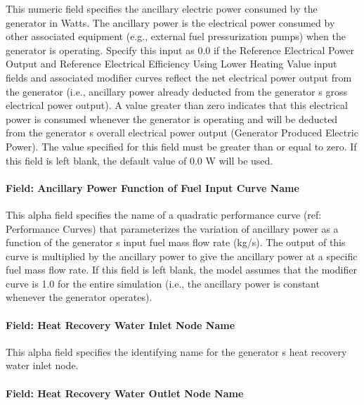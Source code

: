 This numeric field specifies the ancillary electric power consumed by the generator in Watts. The ancillary power is the electrical power consumed by other associated equipment (e.g., external fuel pressurization pumps) when the generator is operating. Specify this input as 0.0 if the Reference Electrical Power Output and Reference Electrical Efficiency Using Lower Heating Value input fields and associated modifier curves reflect the net electrical power output from the generator (i.e., ancillary power already deducted from the generator s gross electrical power output). A value greater than zero indicates that this electrical power is consumed whenever the generator is operating and will be deducted from the generator s overall electrical power output (Generator Produced Electric Power). The value specified for this field must be greater than or equal to zero. If this field is left blank, the default value of 0.0 W will be used.

\paragraph{Field: Ancillary Power Function of Fuel Input Curve Name}\label{field-ancillary-power-function-of-fuel-input-curve-name}

This alpha field specifies the name of a quadratic performance curve (ref: Performance Curves) that parameterizes the variation of ancillary power as a function of the generator s input fuel mass flow rate (kg/s). The output of this curve is multiplied by the ancillary power to give the ancillary power at a specific fuel mass flow rate. If this field is left blank, the model assumes that the modifier curve is 1.0 for the entire simulation (i.e., the ancillary power is constant whenever the generator operates).

\paragraph{Field: Heat Recovery Water Inlet Node Name}\label{field-heat-recovery-water-inlet-node-name}

This alpha field specifies the identifying name for the generator s heat recovery water inlet node.

\paragraph{Field: Heat Recovery Water Outlet Node Name}\label{field-heat-recovery-water-outlet-node-name}

